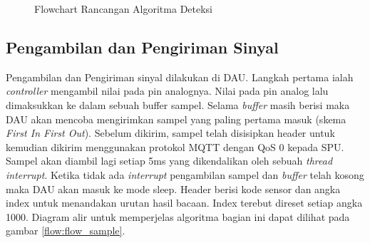 \begin{figure}[H]
	\centering
    \caption{Flowchart Rancangan Algoritma Deteksi}
	\label{flow:fig_detect_algorithm}
\end{figure}

\subsection{Pengambilan dan Pengiriman Sinyal}
Pengambilan dan Pengiriman sinyal dilakukan di DAU. Langkah pertama ialah \textit{controller} mengambil nilai pada pin analognya. Nilai pada pin analog lalu dimaksukkan ke dalam sebuah buffer sampel. Selama \textit{buffer} masih berisi maka DAU akan mencoba mengirimkan sampel yang paling pertama masuk (skema \textit{First In First Out}). Sebelum dikirim, sampel telah disisipkan header untuk kemudian dikirim menggunakan protokol MQTT dengan QoS 0 kepada SPU. Sampel akan diambil lagi setiap 5ms yang dikendalikan oleh sebuah \textit{thread interrupt}. Ketika tidak ada \textit{interrupt} pengambilan sampel dan \textit{buffer} telah kosong maka DAU akan masuk ke mode sleep. Header berisi kode sensor dan angka index untuk menandakan urutan hasil bacaan. Index terebut direset setiap angka 1000. Diagram alir untuk memperjelas algoritma bagian ini dapat dilihat pada gambar \ref{flow:flow_sample}.

